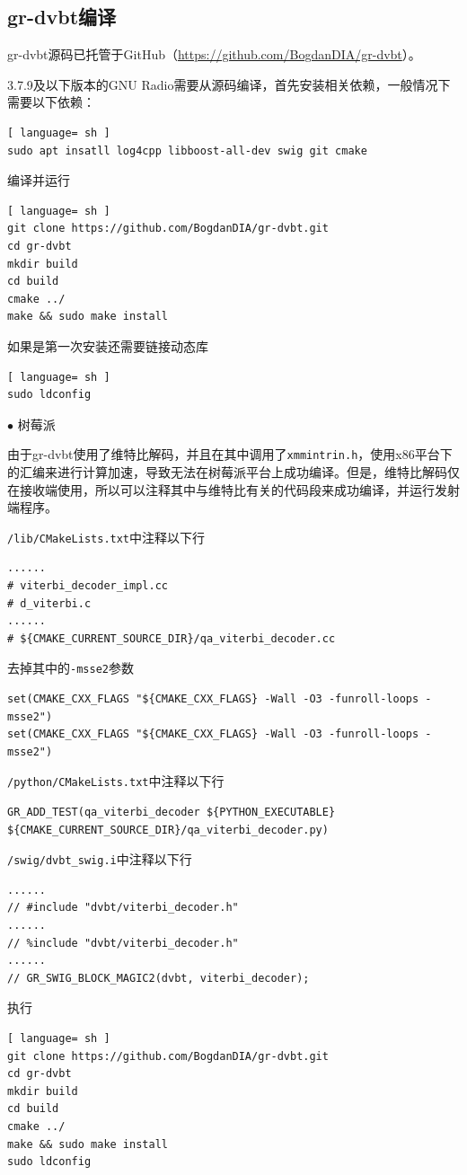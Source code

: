 		\subsection{gr-dvbt编译}
			\label{sec:gr-dvbt_compile}
			\par gr-dvbt源码已托管于GitHub（\href{https://github.com/BogdanDIA/gr-dvbt}{https://github.com/BogdanDIA/gr-dvbt}）。
			\par 3.7.9及以下版本的GNU Radio需要从源码编译，首先安装相关依赖，一般情况下需要以下依赖：
			\begin{lstlisting}[ language= sh ]
sudo apt insatll log4cpp libboost-all-dev swig git cmake
			\end{lstlisting}
			\par 编译并运行
			\begin{lstlisting}[ language= sh ]
git clone https://github.com/BogdanDIA/gr-dvbt.git
cd gr-dvbt
mkdir build
cd build
cmake ../
make && sudo make install
			\end{lstlisting}
			\par 如果是第一次安装还需要链接动态库
			\begin{lstlisting}[ language= sh ]
sudo ldconfig
			\end{lstlisting}
			\par\noindent $\bullet$ 树莓派
			\par 由于gr-dvbt使用了维特比解码，并且在其中调用了\lstinline{xmmintrin.h}，使用x86平台下的汇编来进行计算加速，导致无法在树莓派平台上成功编译。但是，维特比解码仅在接收端使用，所以可以注释其中与维特比有关的代码段来成功编译，并运行发射端程序。
			\par \lstinline{/lib/CMakeLists.txt}中注释以下行
			\begin{lstlisting}
......
# viterbi_decoder_impl.cc
# d_viterbi.c
......
# ${CMAKE_CURRENT_SOURCE_DIR}/qa_viterbi_decoder.cc

			\end{lstlisting}
			\par 去掉其中的\lstinline{-msse2}参数
			\begin{lstlisting}
set(CMAKE_CXX_FLAGS "${CMAKE_CXX_FLAGS} -Wall -O3 -funroll-loops -msse2")
set(CMAKE_CXX_FLAGS "${CMAKE_CXX_FLAGS} -Wall -O3 -funroll-loops -msse2")
			\end{lstlisting}
			\par \lstinline{/python/CMakeLists.txt}中注释以下行
			\begin{lstlisting}
GR_ADD_TEST(qa_viterbi_decoder ${PYTHON_EXECUTABLE} ${CMAKE_CURRENT_SOURCE_DIR}/qa_viterbi_decoder.py)
			\end{lstlisting}
			\par \lstinline{/swig/dvbt_swig.i}中注释以下行
			\begin{lstlisting}
......
// #include "dvbt/viterbi_decoder.h"
......
// %include "dvbt/viterbi_decoder.h"
......
// GR_SWIG_BLOCK_MAGIC2(dvbt, viterbi_decoder);
			\end{lstlisting}
			\par 执行
			\begin{lstlisting}[ language= sh ]
git clone https://github.com/BogdanDIA/gr-dvbt.git
cd gr-dvbt
mkdir build
cd build
cmake ../
make && sudo make install
sudo ldconfig
			\end{lstlisting}